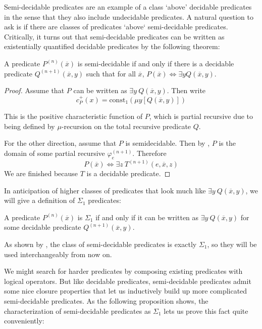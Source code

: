 Semi-decidable predicates are an example of a class `above' decidable predicates in the sense that they also include undecidable predicates. A natural question to ask is if there are classes of predicates `above` semi-decidable predicates. Critically, it turns out that semi-decidable predicates can be written as existentially quantified decidable predicates by the following theorem:

\begin{theorem}\label{defining-sigma1}
A predicate $P^{(n)}(\overline{x})$ is semi-decidable if and only if there is a decidable predicate $Q^{(n+1)}(\overline{x}, y)$ such that for all $\overline{x}$, $P(\overline{x}) \iff \exists y Q(\overline{x}, y)$.
\end{theorem}

\begin{proof}
Assume that $P$ can be written as $\exists y \ Q(\overline{x}, y).$ Then write \[
    c_P^+(x) = \text{const}_1 \left(\mu y \left[Q(\overline{x}, y)\right]\right)
\]

This is the positive characteristic function of $P$, which is partial recursive due to being defined by $\mu$-recursion on the total recursive predicate $Q$.

For the other direction, assume that $P$ is semidecidable. Then by , $P$ is the domain of some partial recursive $\varphi_e^{(n+1)}$. Therefore \[P(\overline{x}) \iff \exists z \ T^{(n+1)}(e, \overline{x}, z)\] We are finished because $T$ is a decidable predicate.
\end{proof}

In anticipation of higher classes of predicates that look much like $\exists y \ Q(\overline{x}, y)$, we will give a definition of $\Sigma_1$ predicates:

\begin{definition}
A predicate $P^{(n)}(\overline{x})$ is $\Sigma_1$ if and only if it can be written as $\exists y \ Q(\overline{x}, y)$ for some decidable predicate $Q^{(n+1)}(\overline{x}, y)$.
\end{definition}

As shown by , the class of semi-decidable predicates is exactly $\Sigma_1$, so they will be used interchangeably from now on.

We might search for harder predicates by composing existing predicates with logical operators. But like decidable predicates, semi-decidable predicates admit some nice closure properties that let us inductively build up more complicated semi-decidable predicates. As the following proposition shows, the characterization of semi-decidable predicates as $\Sigma_1$ lets us prove this fact quite conveniently:

